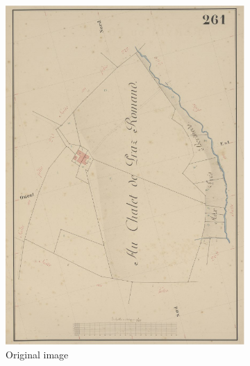 \documentclass[12pt]{article}
\begin{document}
\begin{figure}[H]
    \centering
	\begin{subfigure}[b]{.3\textwidth}
		\centering
		\includegraphics[width=1\linewidth]{images/img5.png}  
		\caption{Original image}
	\end{subfigure}
	\begin{subfigure}[b]{.3\textwidth}
		\centering

\end{subfigure}
\end{figure}
\end{document}

